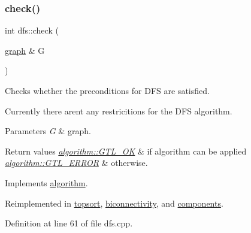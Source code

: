\subsubsection{\texorpdfstring{check()}{check()}}
{\footnotesize\ttfamily int dfs\+::check (\begin{DoxyParamCaption}\item[{\mbox{\hyperlink{classgraph}{graph}} \&}]{G }\end{DoxyParamCaption})\hspace{0.3cm}{\ttfamily [virtual]}}



Checks whether the preconditions for D\+FS are satisfied. 

Currently there aren\textquotesingle{}t any restricitions for the D\+FS algorithm.


\begin{DoxyParams}{Parameters}
{\em G} & graph. \\
\hline
\end{DoxyParams}

\begin{DoxyRetVals}{Return values}
{\em \mbox{\hyperlink{classalgorithm_af1a0078e153aa99c24f9bdf0d97f6710a5114c20e4a96a76b5de9f28bf15e282b}{algorithm\+::\+G\+T\+L\+\_\+\+OK}}} & if algorithm can be applied \\
\hline
{\em \mbox{\hyperlink{classalgorithm_af1a0078e153aa99c24f9bdf0d97f6710a6fcf574690bbd6cf710837a169510dd7}{algorithm\+::\+G\+T\+L\+\_\+\+E\+R\+R\+OR}}} & otherwise. \\
\hline
\end{DoxyRetVals}


Implements \mbox{\hyperlink{classalgorithm_a76361fb03ad1cf643affc51821e43bed}{algorithm}}.



Reimplemented in \mbox{\hyperlink{classtopsort_a777a9a68c4081d22e7b698ed3c515343}{topsort}}, \mbox{\hyperlink{classbiconnectivity_a65e0e821f5e9ce8d210648d462fd2cfa}{biconnectivity}}, and \mbox{\hyperlink{classcomponents_aeeda901d02c65d6c31c8b6148540d7c1}{components}}.



Definition at line 61 of file dfs.\+cpp.


